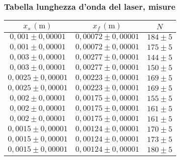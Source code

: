 \subsubsection{Tabella lunghezza d'onda del laser, misure}
    \begin{table}[H]
    \centering
        \begin{tabular}{|c|c|c|}
        \hline
        $ x_s \, (\text{m}) $ & $ x_f \, (\text{m}) $ & $ N $ \\
        \hline
        $0,001 \pm 0,00001$ & $0,00072 \pm 0,00001$ & $184 \pm 5$ \\
        \hline
        $0,001 \pm 0,00001$ & $0,00072 \pm 0,00001$ & $175 \pm 5$ \\
        \hline
        $0,003 \pm 0,00001$ & $0,00277 \pm 0,00001$ & $144 \pm 5$ \\
        \hline
        $0,003 \pm 0,00001$ & $0,00277 \pm 0,00001$ & $150 \pm 5$ \\
        \hline
        $0,0025 \pm 0,00001$ & $0,00223 \pm 0,00001$ & $169 \pm 5$ \\
        \hline
        $0,0025 \pm 0,00001$ & $0,00223 \pm 0,00001$ & $169 \pm 5$ \\
        \hline
        $0,002 \pm 0,00001$ & $0,00175 \pm 0,00001$ & $155 \pm 5$ \\
        \hline
        $0,002 \pm 0,00001$ & $0,00175 \pm 0,00001$ & $161 \pm 5$ \\
        \hline
        $0,002 \pm 0,00001$ & $0,00175 \pm 0,00001$ & $161 \pm 5$ \\
        \hline
        $0,0015 \pm 0,00001$ & $0,00124 \pm 0,00001$ & $170 \pm 5$ \\
        \hline
        $0,0015 \pm 0,00001$ & $0,00124 \pm 0,00001$ & $173 \pm 5$ \\
        \hline
        $0,0015 \pm 0,00001$ & $0,00124 \pm 0,00001$ & $180 \pm 5$ \\
        \hline
        \end{tabular}
    \end{table}

